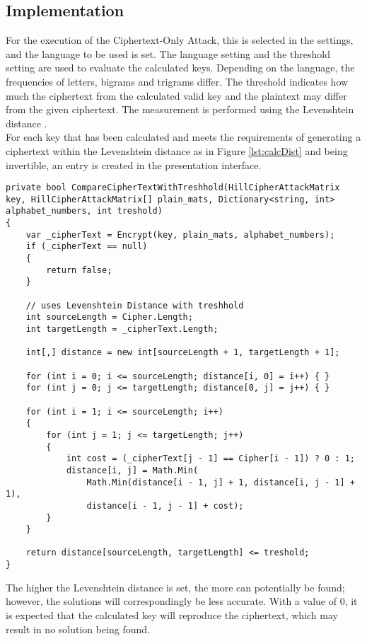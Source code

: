 \documentclass[conference]{IEEEtran}
\begin{document}
\subsection{Implementation}
For the execution of the Ciphertext-Only Attack, this is selected in the settings, and the language to be used is set. The language setting and the threshold setting are used to evaluate the calculated keys. Depending on the language, the frequencies of letters, bigrams and trigrams differ. The threshold indicates how much the ciphertext from the calculated valid key and the plaintext may differ from the given ciphertext. The measurement is performed using the Levenshtein distance \cite{b5}.
\\
For each key that has been calculated and meets the requirements of generating a ciphertext within the Levenshtein distance as in Figure \ref{lst:calcDist} and being invertible, an entry is created in the presentation interface. 
\\
\begin{lstlisting}[caption={CompareCipherTextWithTreshhold method}, label={lst:calcDist}]
private bool CompareCipherTextWithTreshhold(HillCipherAttackMatrix key, HillCipherAttackMatrix[] plain_mats, Dictionary<string, int> alphabet_numbers, int treshold)
{
    var _cipherText = Encrypt(key, plain_mats, alphabet_numbers);
    if (_cipherText == null)
    {
        return false;
    }

    // uses Levenshtein Distance with treshhold
    int sourceLength = Cipher.Length;
    int targetLength = _cipherText.Length;

    int[,] distance = new int[sourceLength + 1, targetLength + 1];

    for (int i = 0; i <= sourceLength; distance[i, 0] = i++) { }
    for (int j = 0; j <= targetLength; distance[0, j] = j++) { }

    for (int i = 1; i <= sourceLength; i++)
    {
        for (int j = 1; j <= targetLength; j++)
        {
            int cost = (_cipherText[j - 1] == Cipher[i - 1]) ? 0 : 1;
            distance[i, j] = Math.Min(
                Math.Min(distance[i - 1, j] + 1, distance[i, j - 1] + 1),
                distance[i - 1, j - 1] + cost);
        }
    }

    return distance[sourceLength, targetLength] <= treshold;
}
\end{lstlisting}

The higher the Levenshtein distance is set, the more can potentially be found; however, the solutions will correspondingly be less accurate. With a value of 0, it is expected that the calculated key will reproduce the ciphertext, which may result in no solution being found.\\
\end{document}
